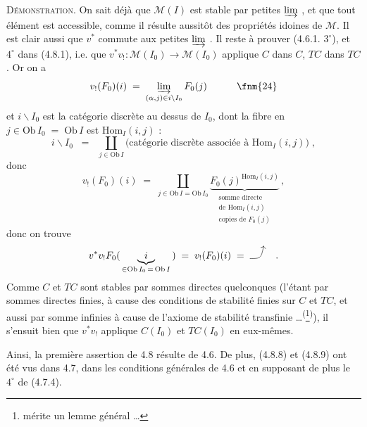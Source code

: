 \textsc{Démonstration}. On sait déjà que $\mathcal{M}(I)$ est stable par petites $\varinjlim$ , et que tout élément est accessible, comme il résulte aussitôt des propriétés idoines de $\mathcal{M}$. Il est clair aussi que $v^{*}$ commute aux petites $\varinjlim$ . Il reste à prouver (4.6.1. $3^{\circ}$), et $4^{\circ}$ dans (4.8.1), i.e.  que $v^{*}v_{!} : \mathcal{M}(I_0) \longrightarrow \mathcal{M}(I_0)$ applique $C$ dans $C$, $TC$ dans $TC$. Or on a
\[
v_{!}(F_0)(i) \;=\; \varinjlim_{(\alpha,j)\in i\backslash I_0} F_0(j) \qquad\quad \text{\fnm{24}}
\]
et $i\backslash I_0$ est la catégorie discrète au dessus de $I_0$, dont la fibre en $j \in \mathrm{Ob}\, I_0 \;=\; \mathrm{Ob}\, I$ est $\mathrm{Hom}_I(i,j)$ :
\[
i\backslash I_0 \;\;=\;\; \coprod_{j\in \mathrm{Ob}\, I} \text{(catégorie discrète associée à $\mathrm{Hom}_I(i,j)$)} \; ,
\]
donc
\[
v_{!}(F_0)(i) \;=\; \coprod_{j\in \mathrm{Ob}\, I = \mathrm{Ob}\, I_0} \underbrace{F_0(j)^{\mathrm{Hom}_I(i,j)}}_{\substack{\text{somme directe}\\ \text{de } \mathrm{Hom}_I(i,j)\\ \text{copies de } F_0(j)}} \, ,
\]
donc on trouve
\[
v^{*}v_{!}F_0( \, \underbrace{\; i \;}_{\in \mathrm{Ob}\, I_0 \,=\, \mathrm{Ob}\, I} \, ) \;=\; v_{!}(F_0)(i) \;=\; \text{\tikz[baseline=0pt]\draw[->] (0,0) .. controls (0.4,0) .. (0.5,0.45);} \quad .
\]
Comme $C$ et $TC$ sont stables par sommes directes quelconques (l'étant par sommes directes finies, à cause des conditions de stabilité finies sur $C$ et $TC$, et aussi par somme infinies à cause de l'axiome de stabilité transfinie \dots\textsuperscript{(}\footnote[25]{mérite un lemme général \dots}\textsuperscript{)}), il s'ensuit bien que $v^{*}v_{!}$ applique $C(I_0)$ et $TC(I_0)$ en eux-mêmes. %

Ainsi, la première assertion de 4.8 résulte de 4.6. De plus, (4.8.8) et (4.8.9) ont été vus dans 4.7, dans les conditions générales de 4.6 et en supposant de plus le $4^{\circ}$ de (4.7.4).

